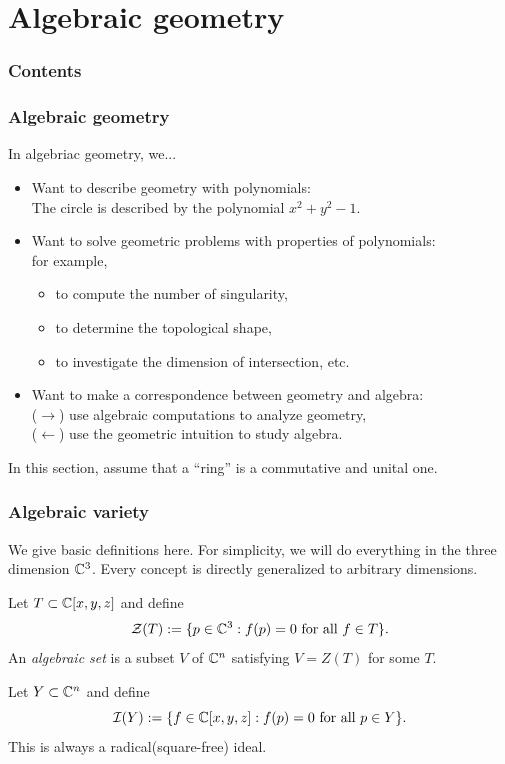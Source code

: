 \documentclass[10pt]{beamer}
\begin{document}
\section{Algebraic geometry}
\begin{frame}
\frametitle{Contents}
  \tableofcontents[currentsection]
\end{frame}

\begin{frame}
\frametitle{Algebraic geometry}
  In algebriac geometry, we...
  \begin{itemize}
    \pause\item Want to describe geometry with polynomials:\\
      \quad The circle is described by the polynomial $x^2+y^2-1$.
    \pause\item Want to solve geometric problems with properties of polynomials:\\
      for example,
      \begin{itemize}
        \item to compute the number of singularity,
        \item to determine the topological shape,
        \item to investigate the dimension of intersection, etc.
      \end{itemize}
    \pause\item Want to make a correspondence between geometry and algebra:\\
      ($\to$) use algebraic computations to analyze geometry,\\
      ($\leftarrow$) use the geometric intuition to study algebra.
  \end{itemize}
  \pause In this section, assume that a ``ring'' is a commutative and unital one.
\end{frame}

\begin{frame}
\frametitle{Algebraic variety}
  \begin{rmk}
  We give basic definitions here.
  For simplicity, we will do everything in the three dimension $\mathbb{C}^3$.
  Every concept is directly generalized to arbitrary dimensions.
  \end{rmk}
  \pause
  \begin{defn}
    Let $T\subset\mathbb{C}[x,y,z]$ and define
    \[\mathcal{Z}(T):=\{p\in\mathbb{C}^3:f(p)=0\text{ for all }f\in T\}.\]
    An \emph{algebraic set} is a subset $V$ of $\mathbb{C}^n$ satisfying $V=Z(T)$ for some $T$.
  \end{defn}
  \pause
  \begin{defn}
    Let $Y\subset\mathbb{C}^n$ and define
    \[\mathcal{I}(Y):=\{f\in\mathbb{C}[x,y,z]:f(p)=0\text{ for all }p\in Y\}.\]
    This is always a radical(square-free) ideal.
  \end{defn}
\end{frame}
\end{document}
